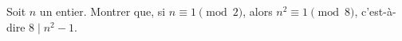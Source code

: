 Soit $n$ un entier. Montrer que, si $n \equiv 1 \pmod 2$, alors $n^2 \equiv 1 \pmod 8$, c'est-à-dire $8 \mid n^2 - 1$.
